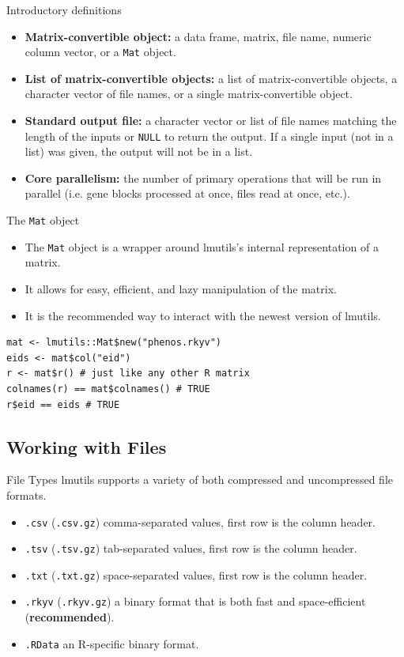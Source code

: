 \documentclass[10pt,handout]{beamer}
\begin{document}
\begin{frame}{Introductory definitions}
  \begin{itemize}[<+->]
    \item \textbf{Matrix-convertible object:} a data frame, matrix, file name, numeric column vector, or a \texttt{Mat} object.
    \item \textbf{List of matrix-convertible objects:} a list of matrix-convertible objects, a character vector of file names, or a single matrix-convertible object.
    \item \textbf{Standard output file:} a character vector or list of file names matching the length of the inputs or \texttt{NULL} to return the output. If a single input (not in a list) was given, the output will not be in a list.
    \item \textbf{Core parallelism:} the number of primary operations that will be run in parallel (i.e. gene blocks processed at once, files read at once, etc.).
  \end{itemize}
\end{frame}

\begin{frame}[fragile]{The \texttt{Mat} object}
  \begin{itemize}[<+->]
    \item The \texttt{Mat} object is a wrapper around lmutils's internal representation of a matrix.
    \item It allows for easy, efficient, and lazy manipulation of the matrix.
    \item It is the recommended way to interact with the newest version of lmutils.
  \end{itemize}
\begin{verbatim}
mat <- lmutils::Mat$new("phenos.rkyv")
eids <- mat$col("eid")
r <- mat$r() # just like any other R matrix
colnames(r) == mat$colnames() # TRUE
r$eid == eids # TRUE
\end{verbatim}
\end{frame}

\subsection{Working with Files}

\begin{frame}[fragile]{File Types}
  lmutils supports a variety of both compressed and uncompressed file formats.
  \begin{itemize}
    \item \texttt{.csv} (\texttt{.csv.gz}) comma-separated values, first row is the column header.
    \item \texttt{.tsv} (\texttt{.tsv.gz}) tab-separated values, first row is the column header.
    \item \texttt{.txt} (\texttt{.txt.gz}) space-separated values, first row is the column header.
    \item \texttt{.rkyv} (\texttt{.rkyv.gz}) a binary format that is both fast and space-efficient (\textbf{recommended}).
    \item \texttt{.RData} an R-specific binary format.
  \end{itemize}
\end{frame}
\end{document}

